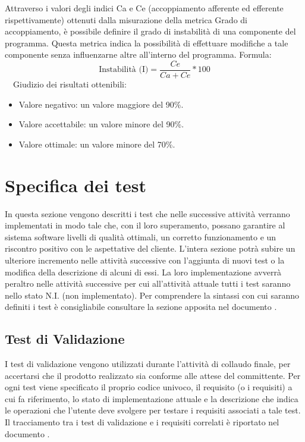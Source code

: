 \documentclass[a4paper, titlepage]{article}
\begin{document}
Attraverso i valori degli indici Ca e Ce (accoppiamento afferente ed efferente rispettivamente) ottenuti dalla misurazione della metrica Grado di accoppiamento, è possibile definire il grado di instabilità di una componente del programma. Questa metrica indica la possibilità di effettuare modifiche a tale componente senza influenzarne altre all’interno del programma.
\newline Formula:
\begin{displaymath}
\mbox{Instabilità (I)}=\frac{Ce}{Ca+Ce}*100
\end{displaymath}
\
\
\newline Giudizio dei risultati ottenibili:
\begin{itemize}
\item Valore negativo: un valore maggiore del 90\%.
\item Valore accettabile: un valore minore del 90\%.
\item Valore ottimale: un valore minore del 70\%.
\end{itemize}


\newpage
\section{Specifica dei test}
In questa sezione vengono descritti i test che nelle successive attività verranno implementati in modo tale che, con il loro superamento, possano garantire al sistema software livelli di qualità ottimali, un corretto funzionamento e un riscontro positivo con le aspettative del cliente.
\newline L'intera sezione potrà subire un ulteriore incremento nelle attività successive con l'aggiunta di nuovi test o la modifica della descrizione di alcuni di essi. La loro implementazione avverrà peraltro nelle attività successive per cui all'attività attuale tutti i test saranno nello stato N.I. (non implementato).
\newline Per comprendere la sintassi con cui saranno definiti i test è consigliabile consultare la sezione apposita nel documento \doc{Norme di Progetto}.

\subsection{Test di Validazione}
I test di validazione vengono utilizzati durante l'attività di collaudo finale, per accertarsi che il prodotto realizzato sia conforme alle attese del committente.
\newline Per ogni test viene specificato il proprio codice univoco, il requisito (o i requisiti) a cui fa riferimento, lo stato di implementazione attuale e la descrizione che indica le operazioni che l'utente deve svolgere per testare i requisiti associati a tale test. 
\newline Il tracciamento tra i test di validazione e i requisiti correlati è riportato nel documento \doc{Analisi dei Requisiti}.
\end{document}
